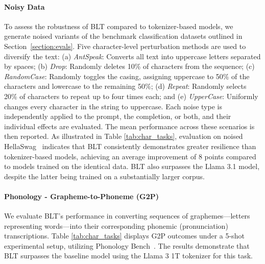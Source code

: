 \paragraph{Noisy Data} To assess the robustness of {\textsc BLT} compared to tokenizer-based models, we generate noised variants of the benchmark classification datasets outlined in Section~\ref{section:evals}. Five character-level perturbation methods are used to diversify the text: (a) \textit{AntSpeak}: Converts all text into uppercase letters separated by spaces; (b) \textit{Drop}: Randomly deletes 10\% of characters from the sequence; (c) \textit{RandomCase}: Randomly toggles the casing, assigning uppercase to 50\% of the characters and lowercase to the remaining 50\%; (d) \textit{Repeat}: Randomly selects 20\% of characters to repeat up to four times each; and (e) \textit{UpperCase}: Uniformly changes every character in the string to uppercase. Each noise type is independently applied to the prompt, the completion, or both, and their individual effects are evaluated. The mean performance across these scenarios is then reported. As illustrated in Table \ref{tab:char_tasks}, evaluation on noised HellaSwag~\citep{Eval_hellaswag} indicates that {\textsc BLT} consistently demonstrates greater resilience than tokenizer-based models, achieving an average improvement of 8 points compared to models trained on the identical data. {\textsc BLT} also surpasses the Llama 3.1 model, despite the latter being trained on a substantially larger corpus.

\paragraph{Phonology - Grapheme-to-Phoneme (G2P)} We evaluate {\textsc BLT}'s performance in converting sequences of graphemes—letters representing words—into their corresponding phonemic (pronunciation) transcriptions. Table \ref{tab:char_tasks} displays G2P outcomes under a 5-shot experimental setup, utilizing Phonology Bench~\citep{suvarna2024phonologybench}. The results demonstrate that {\textsc BLT} surpasses the baseline model using the Llama 3 1T tokenizer for this task.

